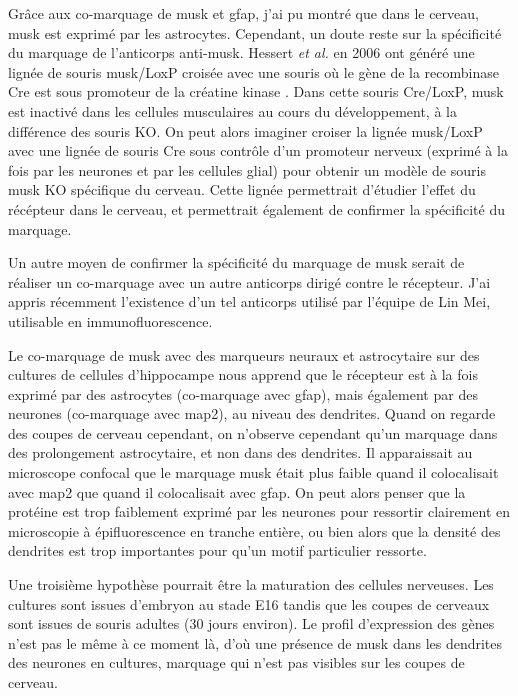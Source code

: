 Grâce aux co-marquage de \gls{musk} et \gls{gfap}, j'ai pu montré que dans le cerveau, \gls{musk} est exprimé par les astrocytes. Cependant,  un doute reste sur la spécificité du marquage de l'anticorps anti-\gls{musk}. Hessert \emph{et al.} en 2006 ont généré une lignée de souris \gls{musk}/LoxP croisée avec une souris où le gène de la recombinase Cre est sous promoteur de la créatine kinase \cite{Hesser2006}. Dans cette souris Cre/LoxP, \gls{musk} est inactivé dans les cellules musculaires au cours du développement, à la différence des souris KO. On peut alors imaginer croiser la lignée \gls{musk}/LoxP avec une lignée de souris Cre sous contrôle d'un promoteur nerveux (exprimé à la fois par les neurones et par les cellules glial) pour obtenir un modèle de souris \gls{musk} KO spécifique du cerveau. Cette lignée permettrait d'étudier l'effet du récépteur dans le cerveau, et permettrait également de confirmer la spécificité du marquage.

Un autre moyen de confirmer la spécificité du marquage de \gls{musk} serait de réaliser un co-marquage avec un autre anticorps dirigé contre le récepteur. J'ai appris récemment l'existence d'un tel anticorps utilisé par l'équipe de Lin Mei, utilisable en immunofluorescence.

Le co-marquage de \gls{musk} avec des marqueurs neuraux et astrocytaire sur des cultures de cellules d'hippocampe nous apprend que le récepteur est à la fois exprimé par des astrocytes (co-marquage avec \gls{gfap}), mais également par des neurones (co-marquage avec \gls{map2}), au niveau des dendrites. Quand on regarde des coupes de cerveau cependant, on n'observe cependant qu'un marquage dans des prolongement astrocytaire, et non dans des dendrites. Il apparaissait au microscope confocal que le marquage \gls{musk} était plus faible quand il colocalisait avec \gls{map2} que quand il colocalisait avec \gls{gfap}. On peut alors penser que la protéine est trop faiblement exprimé par les neurones pour ressortir clairement en microscopie à épifluorescence en tranche entière, ou bien alors que la densité des dendrites est trop importantes pour qu'un motif particulier ressorte. 

Une troisième hypothèse pourrait être la maturation des  cellules nerveuses. Les cultures sont issues d'embryon au stade E16 tandis que les coupes de cerveaux sont issues de souris adultes (30 jours environ). Le profil d'expression des gènes n'est pas le même à ce moment là, d'où une présence de \gls{musk} dans les dendrites des neurones en cultures, marquage qui n'est pas visibles sur les coupes de cerveau. 

